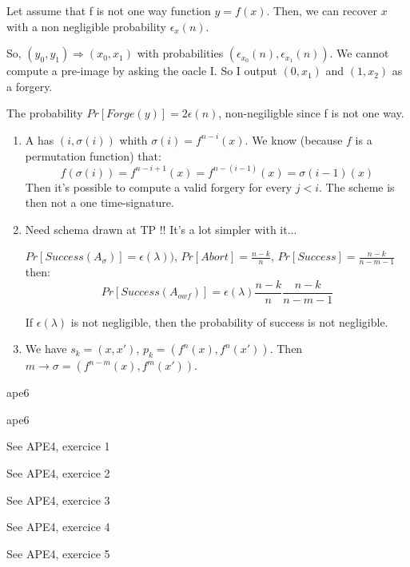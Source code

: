 \newape
\begin{solution}
  Let assume that f is not one way function $y = f(x)$.
  Then, we can recover $x$ with a non negligible probability $\epsilon_x (n)$.
  
  So, $(y_0, y_1) \Rightarrow (x_0, x_1)$ with probabilities $(\epsilon_{x_0} (n), \epsilon_{x_1} (n))$.
  We cannot compute a pre-image by asking the oacle I. So I output $(0, x_1)$ and $(1, x_2)$ as a forgery.

  The probability $Pr[Forge(y)] = 2\epsilon(n)$, non-negiligble since f is not one way.
\end{solution}
\begin{solution}
  \begin{enumerate}
    \item
      A has $(i, \sigma(i))$ whith $\sigma (i) = f^{n-i} (x)$. We know (because $f$ is a permutation function) that:
      $$f(\sigma(i)) = f^{n-i+1}(x) = f^{n-(i-1)}(x) = \sigma(i-1)(x)$$
      Then it's possible to compute a valid forgery for every $j < i$. The scheme is then not a one time-signature.
    \item
      Need schema drawn at TP !! It's a lot simpler with it...

      $Pr[Success (A_\sigma)] = \epsilon(\lambda))$, $Pr[Abort] = \frac{n-k}{n}$, $Pr[Success] = \frac{n-k}{n-m-1}$ then:
      $$ Pr[Success(A_{owf})] = \epsilon(\lambda) \frac{n-k}{n} \frac{n-k}{n-m-1}$$

      If $\epsilon(\lambda)$ is not negligible, then the probability of success is not negligible.
    \item
      We have $s_k = (x, x')$, $p_k = (f^n(x), f^n(x'))$.
      Then $m \rightarrow \sigma = (f^{n-m}(x), f^m(x'))$.
      
  \end{enumerate}
\end{solution}
\begin{solution}
ape6

\end{solution}
\begin{solution}
ape6

\end{solution}


\begin{solution}
See APE4, exercice 1
\end{solution}
\begin{solution}
See APE4, exercice 2
\end{solution}
\begin{solution}
See APE4, exercice 3
\end{solution}
\begin{solution}
See APE4, exercice 4
\end{solution}
\begin{solution}
See APE4, exercice 5
\end{solution}
